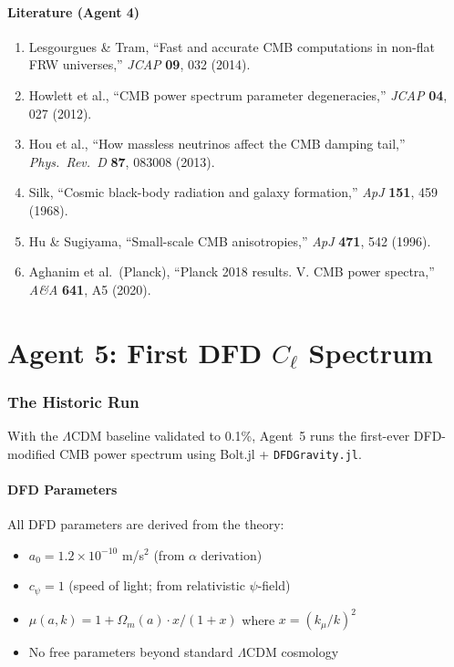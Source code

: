 \documentclass[11pt,a4paper]{article}
\begin{document}
\subsection{Literature (Agent 4)}

\begin{enumerate}
\item Lesgourgues \& Tram, ``Fast and accurate CMB computations in non-flat FRW universes,'' \textit{JCAP} \textbf{09}, 032 (2014).
\item Howlett et al., ``CMB power spectrum parameter degeneracies,'' \textit{JCAP} \textbf{04}, 027 (2012).
\item Hou et al., ``How massless neutrinos affect the CMB damping tail,'' \textit{Phys.\ Rev.\ D} \textbf{87}, 083008 (2013).
\item Silk, ``Cosmic black-body radiation and galaxy formation,'' \textit{ApJ} \textbf{151}, 459 (1968).
\item Hu \& Sugiyama, ``Small-scale CMB anisotropies,'' \textit{ApJ} \textbf{471}, 542 (1996).
\item Aghanim et al.\ (Planck), ``Planck 2018 results. V. CMB power spectra,'' \textit{A\&A} \textbf{641}, A5 (2020).
\end{enumerate}


\part{Agent 5: First DFD $C_\ell$ Spectrum}
\label{part:dfd-cl}

\section{The Historic Run}

With the $\Lambda$CDM baseline validated to 0.1\%, Agent~5 runs the first-ever DFD-modified CMB power spectrum using Bolt.jl + \texttt{DFDGravity.jl}.

\subsection{DFD Parameters}

All DFD parameters are derived from the theory:
\begin{itemize}
\item $a_0 = 1.2 \times 10^{-10}$ m/s$^2$ (from $\alpha$ derivation)
\item $c_\psi = 1$ (speed of light; from relativistic $\psi$-field)
\item $\mu(a,k) = 1 + \Omega_m(a) \cdot x/(1+x)$ where $x = (k_\mu/k)^2$
\item No free parameters beyond standard $\Lambda$CDM cosmology
\end{itemize}
\end{document}
